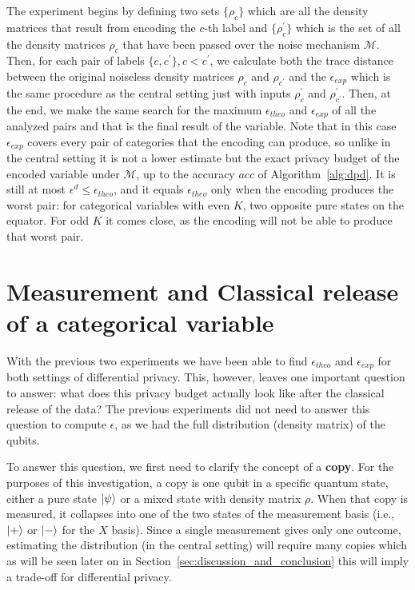 \documentclass{ieeeaccess}
\begin{document}
The experiment begins by defining two sets $\{\rho_c\}$ which are all the density matrices that result from encoding the $c$-th label and $\{\rho_c^{\prime}\}$ which is the set of all the density matrices $\rho_c$ that have been passed over the noise mechanism $\mathcal{M}$. Then, for each pair of labels $\{c, c^{\prime}\}, c < c^{\prime}$, we calculate both the trace distance between the original noiseless density matrices $\rho_c$ and $\rho_{c^{\prime}}$ and the $\epsilon_{exp}$ which is the same procedure as the central setting just with inputs $\rho_c^{\prime}$ and $\rho_{c^{\prime}}^{\prime}$. Then, at the end, we make the same search for the maximum $\epsilon_{theo}$ and $\epsilon_{exp}$ of all the analyzed pairs and that is the final result of the variable. Note that in this case $\epsilon_{exp}$ covers every pair of categories that the encoding can produce, so unlike in the central setting it is not a lower estimate but the exact privacy budget of the encoded variable under $\mathcal{M}$, up to the accuracy $\mathit{acc}$ of Algorithm~\ref{alg:dpd}. It is still at most $\epsilon^{d} \leq \epsilon_{theo}$, and it equals $\epsilon_{theo}$ only when the encoding produces the worst pair: for categorical variables with even $K$, two opposite pure states on the equator. For odd $K$ it comes close, as the encoding will not be able to produce that worst pair.


\section{Measurement and Classical release of a categorical variable}
\label{sec:measurement_release}

With the previous two experiments we have been able to find $\epsilon_{theo}$ and $\epsilon_{exp}$ for both settings of differential privacy. This, however, leaves one important question to answer: what does this privacy budget actually look like after the classical release of the data? The previous experiments did not need to answer this question to compute $\epsilon$, as we had the full distribution (density matrix) of the qubits.

To answer this question, we first need to clarify the concept of a \textbf{copy}. For the purposes of this investigation, a copy is one qubit in a specific quantum state, either a pure state $\ket{\psi}$ or a mixed state with density matrix $\rho$. When that copy is measured, it collapses into one of the two states of the measurement basis (i.e., $\ket{+}$ or $\ket{-}$ for the $X$ basis). Since a single measurement gives only one outcome, estimating the distribution  (in the central setting) will require many copies which as will be seen later on in Section~\ref{sec:discussion_and_conclusion} this will imply a trade-off for differential privacy.
\end{document}
